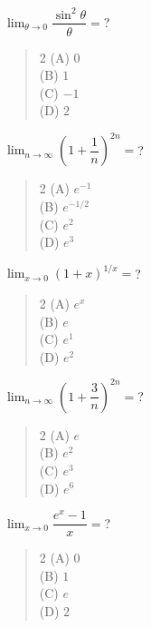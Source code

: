 \documentclass[11pt,a4paper]{article}
\begin{document}
\begin{mcqlist}
\item $\displaystyle\lim_{\theta\to0}\dfrac{\sin^2\theta}{\theta} = $?
\begin{quote}\begin{multicols}{2}
\noindent (A) $0$ \\
(B) $1$ \\
(C) $-1$ \\
(D) $2$
\end{multicols}\end{quote}

\item $\displaystyle\lim_{n\to\infty}\left(1+\dfrac{1}{n}\right)^{2n} = $?
\begin{quote}\begin{multicols}{2}
\noindent (A) $e^{-1}$ \\
(B) $e^{-1/2}$ \\
(C) $e^2$ \\
(D) $e^3$
\end{multicols}\end{quote}

\item $\displaystyle\lim_{x\to0}(1+x)^{1/x} = $?
\begin{quote}\begin{multicols}{2}
\noindent (A) $e^x$ \\
(B) $e$ \\
(C) $e^1$ \\
(D) $e^2$
\end{multicols}\end{quote}

\item $\displaystyle\lim_{n\to\infty}\left(1+\dfrac{3}{n}\right)^{2n} = $?
\begin{quote}\begin{multicols}{2}
\noindent (A) $e$ \\
(B) $e^2$ \\
(C) $e^3$ \\
(D) $e^6$
\end{multicols}\end{quote}

\item $\displaystyle\lim_{x\to0}\dfrac{e^x-1}{x} = $?
\begin{quote}\begin{multicols}{2}
\noindent (A) $0$ \\
(B) $1$ \\
(C) $e$ \\
(D) $2$
\end{multicols}\end{quote}


\end{mcqlist}
\end{document}
